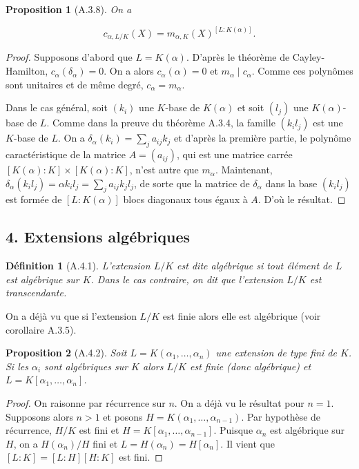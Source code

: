 \documentclass[12pts,a4paper]{report}
\newtheorem{definition}{Définition}
\newtheorem{proposition}{Proposition}
\begin{document}
\begin{proposition}[A.3.8]
On a

\[
c_{\alpha, L/K}(X) = m_{\alpha, K}(X)^{[L:K(\alpha)]}.
\]
\end{proposition}

\begin{proof}
Supposons d'abord que \( L = K(\alpha) \). D'après le théorème de Cayley-Hamilton, \( c_\alpha (\delta_\alpha) = 0 \). On a alors \( c_\alpha (\alpha) = 0 \) et \( m_\alpha \mid c_\alpha \). Comme ces polynômes sont unitaires et de même degré, \( c_\alpha = m_\alpha \).

Dans le cas général, soit \( (k_i) \) une \( K \)-base de \( K(\alpha) \) et soit \( (l_j) \) une \( K(\alpha) \)-base de \( L \). Comme dans la preuve du théorème A.3.4, la famille \( (k_i l_j) \) est une \( K \)-base de \( L \). On a \( \delta_\alpha (k_i) = \sum_j a_{ij} k_j \) et d'après la première partie, le polynôme caractéristique de la matrice \( A = (a_{ij}) \), qui est une matrice carrée \( [K(\alpha):K] \times [K(\alpha):K] \), n'est autre que \( m_\alpha \). Maintenant, \( \delta_\alpha (k_i l_j) = \alpha k_i l_j = \sum_j a_{ij} k_j l_j \), de sorte que la matrice de \( \delta_\alpha \) dans la base \( (k_i l_j) \) est formée de \( [L:K(\alpha)] \) blocs diagonaux tous égaux à \( A \). D'où le résultat. \qedhere
\end{proof}

\subsection*{4. Extensions algébriques}

\begin{definition}[A.4.1]
L'extension \( L/K \) est dite algébrique si tout élément de \( L \) est algébrique sur \( K \). Dans le cas contraire, on dit que l'extension \( L/K \) est transcendante.
\end{definition}

On a déjà vu que si l'extension \( L/K \) est finie alors elle est algébrique (voir corollaire A.3.5).

\begin{proposition}[A.4.2]
Soit \( L = K(\alpha_1, \ldots, \alpha_n) \) une extension de type fini de \( K \). Si les \( \alpha_i \) sont algébriques sur \( K \) alors \( L/K \) est finie (donc algébrique) et \( L = K[\alpha_1, \ldots, \alpha_n] \).
\end{proposition}

\begin{proof}
On raisonne par récurrence sur \( n \). On a déjà vu le résultat pour \( n = 1 \). Supposons alors \( n > 1 \) et posons \( H = K(\alpha_1, \ldots, \alpha_{n-1}) \). Par hypothèse de récurrence, \( H/K \) est fini et \( H = K[\alpha_1, \ldots, \alpha_{n-1}] \). Puisque \( \alpha_n \) est algébrique sur \( H \), on a \( H(\alpha_n)/H \) fini et \( L = H(\alpha_n) = H[\alpha_n] \). Il vient que \( [L : K] = [L : H][H : K] \) est fini. \qedhere
\end{proof}
\end{document}
